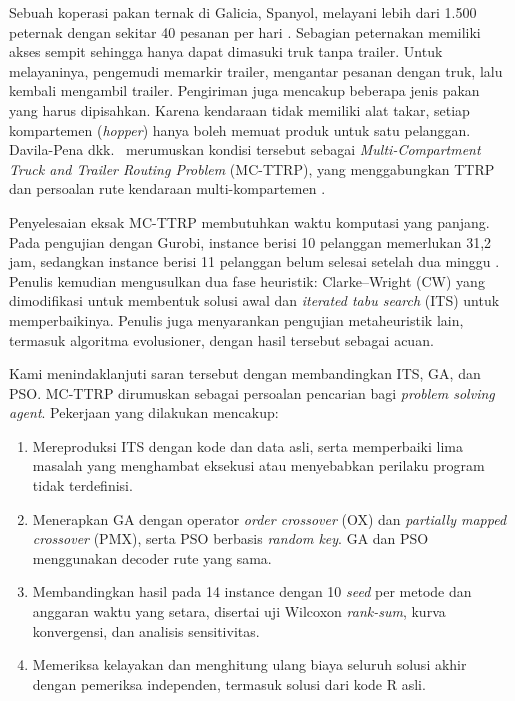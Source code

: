 \documentclass[conference]{IEEEtran}
\begin{document}
Sebuah koperasi pakan ternak di Galicia, Spanyol, melayani lebih dari 1.500 peternak dengan sekitar 40 pesanan per hari \cite{davila2023}. Sebagian peternakan memiliki akses sempit sehingga hanya dapat dimasuki truk tanpa trailer. Untuk melayaninya, pengemudi memarkir trailer, mengantar pesanan dengan truk, lalu kembali mengambil trailer. Pengiriman juga mencakup beberapa jenis pakan yang harus dipisahkan. Karena kendaraan tidak memiliki alat takar, setiap kompartemen (\textit{hopper}) hanya boleh memuat produk untuk satu pelanggan. Davila-Pena dkk.\ \cite{davila2023} merumuskan kondisi tersebut sebagai \textit{Multi-Compartment Truck and Trailer Routing Problem} (MC-TTRP), yang menggabungkan TTRP \cite{chao2002} dan persoalan rute kendaraan multi-kompartemen \cite{ostermeier2021}.

Penyelesaian eksak MC-TTRP membutuhkan waktu komputasi yang panjang. Pada pengujian dengan Gurobi, instance berisi 10 pelanggan memerlukan 31,2 jam, sedangkan instance berisi 11 pelanggan belum selesai setelah dua minggu \cite{davila2023}. Penulis kemudian mengusulkan dua fase heuristik: Clarke--Wright (CW) yang dimodifikasi untuk membentuk solusi awal dan \textit{iterated tabu search} (ITS) untuk memperbaikinya. Penulis juga menyarankan pengujian metaheuristik lain, termasuk algoritma evolusioner, dengan hasil tersebut sebagai acuan.

Kami menindaklanjuti saran tersebut dengan membandingkan ITS, GA, dan PSO. MC-TTRP dirumuskan sebagai persoalan pencarian bagi \textit{problem solving agent}. Pekerjaan yang dilakukan mencakup:
\begin{enumerate}
\item Mereproduksi ITS dengan kode dan data asli, serta memperbaiki lima masalah yang menghambat eksekusi atau menyebabkan perilaku program tidak terdefinisi.
\item Menerapkan GA dengan operator \textit{order crossover} (OX) dan \textit{partially mapped crossover} (PMX), serta PSO berbasis \textit{random key}. GA dan PSO menggunakan decoder rute yang sama.
\item Membandingkan hasil pada 14 instance dengan 10 \textit{seed} per metode dan anggaran waktu yang setara, disertai uji Wilcoxon \textit{rank-sum}, kurva konvergensi, dan analisis sensitivitas.
\item Memeriksa kelayakan dan menghitung ulang biaya seluruh solusi akhir dengan pemeriksa independen, termasuk solusi dari kode R asli.
\end{enumerate}
\end{document}
